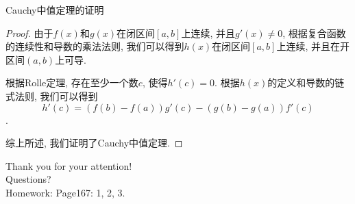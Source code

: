 \documentclass[
10pt,
aspectratio=43,
]{beamer}
\begin{document}
	  \begin{frame}{Cauchy中值定理的证明}
		\begin{proof}
	  由于$f(x)$和$g(x)$在闭区间$[a, b]$上连续, 并且$g'(x) \neq 0$, 根据复合函数的连续性和导数的乘法法则, 我们可以得到$h(x)$在闭区间$[a, b]$上连续, 并且在开区间$(a, b)$上可导. 
  
	  根据Rolle定理, 存在至少一个数$c$, 使得$h'(c) = 0$. 根据$h(x)$的定义和导数的链式法则, 我们可以得到
	  $$h'(c) = (f(b) - f(a))g'(c) - (g(b) - g(a))f'(c)$$. 
  
	  综上所述, 我们证明了Cauchy中值定理. 
	\end{proof}
  \end{frame}


\begin{frame}[plain]
	\vfill
	\centering
	{
	\centering \Huge \color{white} Thank you for your attention!\\[10pt]Questions?\\ [10pt] Homework: Page167: 1, 2, 3.
	}
	\vfill
\end{frame}
\end{document}
